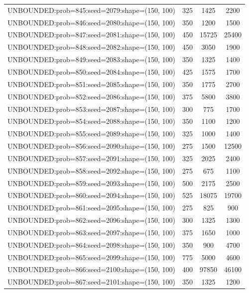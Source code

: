 \begin{longtable}{lccc}
UNBOUNDED:prob=845:seed=2079:shape=(150, 100) &      325 &  1425 &   2200 \\
UNBOUNDED:prob=846:seed=2080:shape=(150, 100) &      350 &  1200 &   1500 \\
UNBOUNDED:prob=847:seed=2081:shape=(150, 100) &      450 & 15725 &  25400 \\
UNBOUNDED:prob=848:seed=2082:shape=(150, 100) &      450 &  3050 &   1900 \\
UNBOUNDED:prob=849:seed=2083:shape=(150, 100) &      350 &  1325 &   1400 \\
UNBOUNDED:prob=850:seed=2084:shape=(150, 100) &      425 &  1575 &   1700 \\
UNBOUNDED:prob=851:seed=2085:shape=(150, 100) &      350 &  1775 &   2700 \\
UNBOUNDED:prob=852:seed=2086:shape=(150, 100) &      375 &  5800 &   3800 \\
UNBOUNDED:prob=853:seed=2087:shape=(150, 100) &      300 &   775 &   1700 \\
UNBOUNDED:prob=854:seed=2088:shape=(150, 100) &      350 &  1100 &   1200 \\
UNBOUNDED:prob=855:seed=2089:shape=(150, 100) &      325 &  1000 &   1400 \\
UNBOUNDED:prob=856:seed=2090:shape=(150, 100) &      275 &  1500 &  12500 \\
UNBOUNDED:prob=857:seed=2091:shape=(150, 100) &      325 &  2025 &   2400 \\
UNBOUNDED:prob=858:seed=2092:shape=(150, 100) &      275 &   675 &   1100 \\
UNBOUNDED:prob=859:seed=2093:shape=(150, 100) &      500 &  2175 &   2500 \\
UNBOUNDED:prob=860:seed=2094:shape=(150, 100) &      525 & 18075 &  19700 \\
UNBOUNDED:prob=861:seed=2095:shape=(150, 100) &      275 &   825 &    900 \\
UNBOUNDED:prob=862:seed=2096:shape=(150, 100) &      300 &  1325 &   1300 \\
UNBOUNDED:prob=863:seed=2097:shape=(150, 100) &      375 &  1650 &   1000 \\
UNBOUNDED:prob=864:seed=2098:shape=(150, 100) &      350 &   900 &   4700 \\
UNBOUNDED:prob=865:seed=2099:shape=(150, 100) &      775 &  5000 &   4600 \\
UNBOUNDED:prob=866:seed=2100:shape=(150, 100) &      400 & 97850 &  46100 \\
UNBOUNDED:prob=867:seed=2101:shape=(150, 100) &      350 &  1325 &   1200 \\

\end{longtable}
